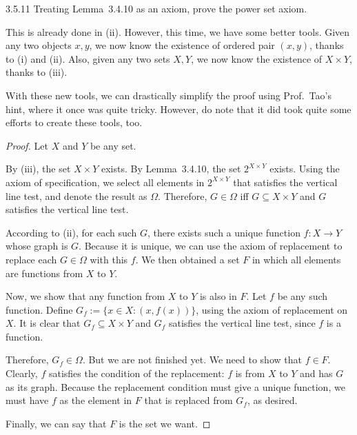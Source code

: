 \begin{exercise}{3.5.11}
	Treating Lemma~3.4.10 as an axiom, prove the power set axiom.
	
	This is already done in  (ii). However, this time, we have some better tools. Given any two objects $x,y$, we now know the existence of ordered pair $(x,y)$, thanks to  (i) and (ii). Also, given any two sets $X,Y$, we now know the existence of $X \times Y$, thanks to  (iii).
	
	With these new tools, we can drastically simplify the proof using Prof.~Tao's hint, where it once was quite tricky. However, do note that it did took quite some efforts to create these tools, too.
\end{exercise}
\begin{proof}
	Let $X$ and $Y$ be any set.
	
	By  (iii), the set $X \times Y$ exists. By Lemma~3.4.10, the set $2^{X \times Y}$ exists. Using the axiom of specification, we select all elements in $2^{X \times Y}$ that satisfies the vertical line test, and denote the result as $\Omega$. Therefore, $G \in \Omega$ iff $G \subseteq X \times Y$ and $G$ satisfies the vertical line test.
	
	According to  (ii), for each such $G$, there exists such a unique function $f : X \to Y$ whose graph is $G$. Because it is unique, we can use the axiom of replacement to replace each $G \in \Omega$ with this $f$. We then obtained a set $F$ in which all elements are functions from $X$ to $Y$.
	
	Now, we show that any function from $X$ to $Y$ is also in $F$. Let $f$ be any such function. Define $G_f := \{x \in X: (x,f(x))\}$, using the axiom of replacement on $X$. It is clear that $G_f \subseteq X \times Y$ and $G_f$ satisfies the vertical line test, since $f$ is a function.
	
	Therefore, $G_f \in \Omega$. But we are not finished yet. We need to show that $f \in F$. Clearly, $f$ satisfies the condition of the replacement: $f$ is from $X$ to $Y$ and has $G$ as its graph. Because the replacement condition must give a unique function, we must have $f$ as the element in $F$ that is replaced from $G_f$, as desired.
	
	Finally, we can say that $F$ is the set we want.
\end{proof}

